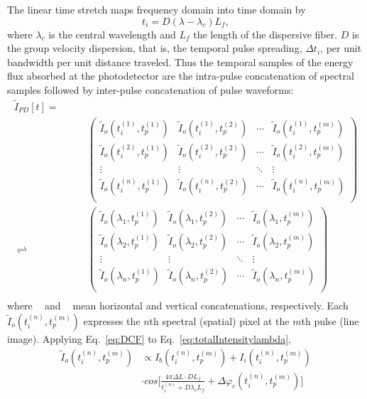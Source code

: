 \documentclass[aps,pra,reprint,superscriptaddress]{revtex4-1}
\DeclareMathOperator{\vercat}{cat_\downarrow} %
\DeclareMathOperator{\horcat}{cat_\rightarrow} %
\begin{document}
The linear time stretch maps frequency domain into time domain by
\begin{equation} \label{eq:DCF}
t_i = D (\lambda - \lambda_c) L_f,
\end{equation}
where $\lambda_c$ is the central wavelength and $L_f$ the length of the dispersive fiber. $D$ is the group velocity dispersion, that is, the temporal pulse spreading, $\Delta t_i$, per unit bandwidth per unit distance traveled. Thus the temporal samples of the energy flux absorbed at the photodetector are the intra-pulse concatenation of spectral samples followed by inter-pulse concatenation of pulse waveforms:
\begin{equation}
\begin{split}
\tilde{I}_{PD}[t] = \quad\quad&\quad\\
\horcat\vercat &
\begin{pmatrix}
\tilde{I}_{o}(t_i^{(1)}, t_p^{(1)})&	\tilde{I}_{o}(t_i^{(1)}, t_p^{(2)})&	\cdots& \tilde{I}_{o}(t_i^{(1)}, t_p^{(m)})\\
\tilde{I}_{o}(t_i^{(2)}, t_p^{(1)})&	\tilde{I}_{o}(t_i^{(2)}, t_p^{(2)})&	\cdots& \tilde{I}_{o}(t_i^{(2)}, t_p^{(m)})\\
\vdots&									\vdots&									\ddots& \vdots								 \\
\tilde{I}_{o}(t_i^{(n)}, t_p^{(1)})&	\tilde{I}_{o}(t_i^{(n)}, t_p^{(2)})&	\cdots& \tilde{I}_{o}(t_i^{(n)}, t_p^{(m)})\\
\end{pmatrix} \\
\rightleftharpoons \horcat\vercat &
\begin{pmatrix}
\tilde{I}_{o}(\lambda_1, t_p^{(1)})  &\tilde{I}_{o}(\lambda_1, t_p^{(2)})   &\cdots  &\tilde{I}_{o}(\lambda_1, t_p^{(m)})\\
\tilde{I}_{o}(\lambda_2, t_p^{(1)})  &\tilde{I}_{o}(\lambda_2, t_p^{(2)})   &\cdots  &\tilde{I}_{o}(\lambda_2, t_p^{(m)})\\
\vdots						   		 &\vdots							    	&\ddots  &\vdots					 \\
\tilde{I}_{o}(\lambda_n, t_p^{(1)})  &\tilde{I}_{o}(\lambda_n, t_p^{(2)})   &\cdots  &\tilde{I}_{o}(\lambda_n, t_p^{(m)})\\
\end{pmatrix} \\
\end{split}
\end{equation}
where $\horcat$ and $\vercat$ mean horizontal and vertical concatenations, respectively. Each $\tilde{I}_{o}(t_i^{(n)}, t_p^{(m)})$ expresses the $n$th spectral (spatial) pixel at the $m$th pulse (line image). Applying Eq.~\ref{eq:DCF} to Eq.~\ref{eq:totalIntensitylambda},
\begin{equation}\label{eq:afterDCF}
\begin{split}
\tilde{I}_{o}(t_i^{(n)}, t_p^{(m)}) & \propto I_b (t_i^{(n)}, t_p^{(m)}) + I_i (t_i^{(n)}, t_p^{(m)}) \\
& \cdot cos\Bigg[ \frac{4\pi\Delta L \cdot D L_f}{t_i^{(n)} + D\lambda_c L_f} + \Delta \varphi_c(t_i^{(n)}, t_p^{(m)}) \Bigg]
\end{split}
\end{equation}
\end{document}
